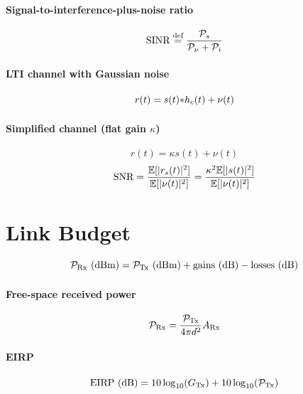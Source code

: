 \paragraph{Signal-to-interference-plus-noise ratio}
\begin{equation}
\textrm{SINR} \stackrel{\text{def}}{=} \frac{{\cal P}_s}{{\cal P}_{\nu} + {\cal P}_i}
\label{eq:sinr}
\end{equation}

\paragraph{LTI channel with Gaussian noise}
\begin{equation}
r(t) = s(t) {\ast} h_c(t) + \nu(t)
\label{eq:ltiGaussianChannelPreliminar}
\end{equation}

\paragraph{Simplified channel (flat gain $\kappa$)}
\[
r(t) = \kappa s(t) + \nu(t)
\]
\begin{equation}
{\textrm{SNR}} = \frac{\mathbb{E}[|r_s(t)|^2]}{\mathbb{E}[|\nu(t)|^2]} = \frac{\kappa^2 \mathbb{E}[|s(t)|^2]}{\mathbb{E}[|\nu(t)|^2]}
\label{eq:snrAtReceiver}
\end{equation}

\section*{Link Budget}

\begin{equation}
{\cal P}_{\textrm{Rx}} \textrm{~(dBm)} = {\cal P}_{\textrm{Tx}} \textrm{~(dBm)} + \textrm{gains~(dB)} - \textrm{losses~(dB)}
\label{eq:linkBudgetIndBm}
\end{equation}

\paragraph{Free-space received power}
\begin{equation}
{\cal P}_{\textrm{Rx}}  =   \frac{ {\cal P}_{\textrm{Tx}} }{4 \pi d^2} A_{\textrm{Rx}}
\label{eq:receivedPowerFreeSpace}
\end{equation}

\paragraph{EIRP}
\begin{equation}
\textrm{EIRP (dB)} = 10 \log_{10} (G_{\textrm{Tx}}) + 10 \log_{10} ({\cal P}_{\textrm{Tx}})
\label{eq:eirp_dB}
\end{equation}


